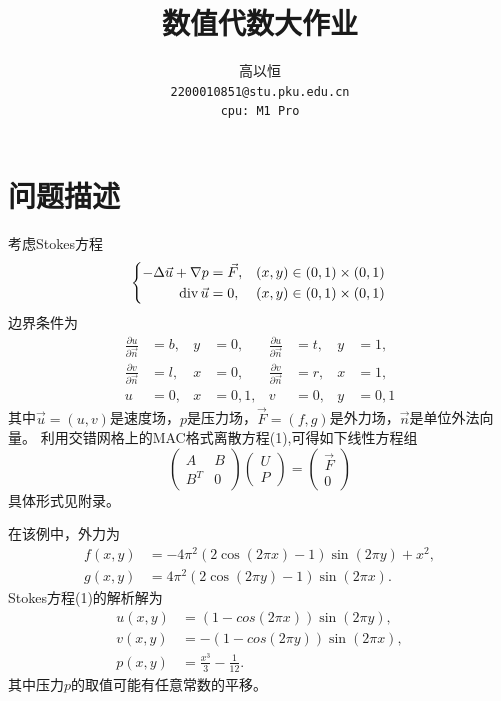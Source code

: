 \documentclass{article}
\title{数值代数大作业}
\author{%
  高以恒 \\
  \texttt{2200010851@stu.pku.edu.cn} \\
  \texttt{cpu: M1 Pro} \\
}
\begin{document}
\maketitle

\section{问题描述}
考虑Stokes方程
\begin{equation}
  \left\{\begin{aligned}
  -\Delta \vec{u}+\nabla p & =\vec{F}, & (x, y) & \in(0,1) \times(0,1) \\
  \operatorname{div} \vec{u} & =0, & (x, y) & \in(0,1) \times(0,1)
  \end{aligned}\right. \\
\end{equation}
边界条件为
\begin{equation*}
  \begin{aligned}
    \frac{\partial u}{\partial \vec{n}}&=b, & y & =0, & \frac{\partial u}{\partial \vec{n}}&=t, & y & =1, \\
    \frac{\partial v}{\partial \vec{n}}&=l, & x & =0, & \frac{\partial v}{\partial \vec{n}}&=r, & x & =1, \\
    u & =0, & x & =0,1, &
    v & =0, & y & =0,1
    \end{aligned}
\end{equation*}
其中$\vec{u}=(u, v)$是速度场，$p$是压力场，$\vec{F}=(f, g)$是外力场，$\vec{n}$是单位外法向量。
利用交错网格上的MAC格式离散方程(1),可得如下线性方程组
\begin{equation}
  \begin{pmatrix}
    A & B \\
    B^{T} & 0
  \end{pmatrix}
  \begin{pmatrix}
    U \\
    P
  \end{pmatrix}
  =
  \begin{pmatrix}
    \vec{F} \\
    0
  \end{pmatrix}
\end{equation}
具体形式见附录。

在该例中，外力为
\begin{equation*}
  \begin{aligned}
    f(x, y)&=-4\pi^{2}(2\cos(2\pi x)-1)\sin(2\pi y)+x^2, \\
    g(x, y)&=4\pi^{2}(2\cos(2\pi y)-1)\sin(2\pi x).
  \end{aligned}
\end{equation*}
Stokes方程(1)的解析解为
\begin{equation*}
  \begin{aligned}
    u(x, y)&=(1-cos(2\pi x))\sin(2\pi y), \\
    v(x, y)&=-(1-cos(2\pi y))\sin(2\pi x), \\
    p(x, y)&=\frac{x^3}{3}-\frac{1}{12}.
  \end{aligned}
\end{equation*}
其中压力$p$的取值可能有任意常数的平移。
\end{document}
